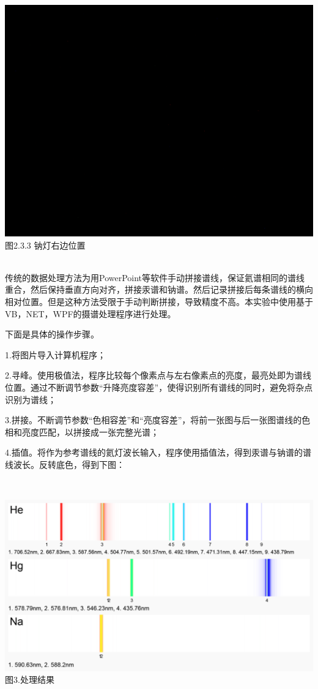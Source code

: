 \documentclass{ctexart}
\begin{document}
\begin{minipage}[c]{0.33\textwidth}
    \includegraphics[scale=0.05]{3-3} \\\small{图2.3.3 钠灯右边位置}\centering
\end{minipage}

~\\

传统的数据处理方法为用PowerPoint等软件手动拼接谱线，保证氦谱相同的谱线重合，然后保持垂直方向对齐，拼接汞谱和钠谱。然后记录拼接后每条谱线的横向相对位置。但是这种方法受限于手动判断拼接，导致精度不高。本实验中使用基于VB，NET，WPF的摄谱处理程序进行处理。

下面是具体的操作步骤。

1.将图片导入计算机程序；

2.寻峰。使用极值法，程序比较每个像素点与左右像素点的亮度，最亮处即为谱线位置。通过不断调节参数“升降亮度容差”，使得识别所有谱线的同时，避免将杂点识别为谱线；

3.拼接。不断调节参数“色相容差”和“亮度容差”，将前一张图与后一张图谱线的色相和亮度匹配，以拼接成一张完整光谱；

4.插值。将作为参考谱线的氦灯波长输入，程序使用插值法，得到汞谱与钠谱的谱线波长。反转底色，得到下图：

~\\
\begin{minipage}[c]{1\textwidth}
    \includegraphics[scale=0.7]{white} \\\small{图3.处理结果}\centering
\end{minipage}
\end{document}
